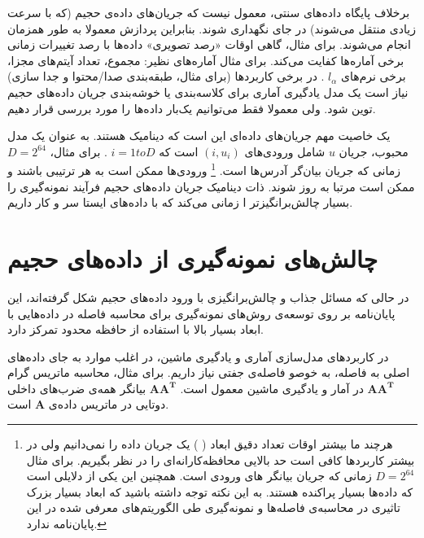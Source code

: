 برخلاف پایگاه‌ داده‌های سنتی، معمول نیست که جریان‌های داده‌ی حجیم (که با سرعت زیادی منتقل می‌شوند) در جای نگهداری شوند. بنابراین پردازش معمولا به طور همزمان انجام می‌شوند. برای مثال، گاهی اوقات «رصد تصویری» داده‌ها با رصد تغییرات زمانی برخی آماره‌ها کفایت می‌کند. برای مثال آماره‌های نظیر: مجموع، تعداد آیتم‌های مجزا، برخی نرم‌های 
$l_\alpha$
. در برخی کاربردها (برای مثال، طبقه‌بندی صدا/محتوا و جدا سازی) نیاز است یک مدل یادگیری آماری برای کلاسه‌بندی
یا خوشه‌بندی
جریان داده‌های حجیم توین شود. ولی معمولا فقط می‌توانیم یک‌بار داده‌ها را مورد بررسی قرار دهیم.

یک خاصیت مهم جریان‌های داده‌ای این است که دینامیک هستند. به عنوان یک مدل محبوب، جریان 
$u$
شامل ورودی‌های 
$(i, u_i)$
است که 
$i = 1 to D$
. برای مثال،
$D = 2^{64}$
زمانی که جریان بیان‌گر 
آدرس‌ها است.
\footnote{
هرچند ما بیشتر اوقات تعداد دقیق ابعاد (
) یک جریان داده را نمی‌دانیم ولی در بیشتر کاربردها کافی است حد بالایی محافظه‌کارانه‌ای را در نظر بگیریم. برای مثال 
$D = 2^{64}$
زمانی که جریان بیانگر 
های ورودی است. همچنین این یکی از دلایلی است که داده‌ها بسیار پراکنده هستند. به این نکته توجه داشته باشید که ابعاد بسیار بزرک تاثیری در محاسبه‌ی فاصله‌ها و نمونه‌گیری طی الگوریتم‌های معرفی شده در این پایان‌نامه ندارد.
}
ورودی‌ها ممکن است به هر ترتیبی باشند و ممکن است مرتبا به روز شوند. ذات دینامیک جریان داده‌های حجیم فرآیند نمونه‌گیری را بسیار چالش‌برانگیزتر ا زمانی ‌می‌کند که با داده‌های ایستا سر و کار داریم.

\section{
چالش‌های نمونه‌گیری از داده‌های حجیم
}
در حالی که مسائل جذاب و چالش‌برانگیزی با ورود داده‌های حجیم شکل گرفته‌اند، این پایان‌نامه بر روی توسعه‌ی روش‌های نمونه‌گیری برای محاسبه فاصله در داده‌هایی با ابعاد بسیار بالا با استفاده از حافظه محدود تمرکز دارد.

در کاربردهای مدل‌سازی آماری و یادگیری ماشین، در اغلب موارد به جای داده‌های اصلی به فاصله، به خوصو فاصله‌ی جفتی نیاز داریم. برای مثال، محاسبه ماتریس گرام
$\mathbf{AA^T}$
در آمار و یادگیری ماشین معمول است. 
$\mathbf{AA^T}$
بیانگر همه‌ی ضرب‌های داخلی دوتایی در ماتریس داده‌ی 
‌$\mathbf{A}$
است.

